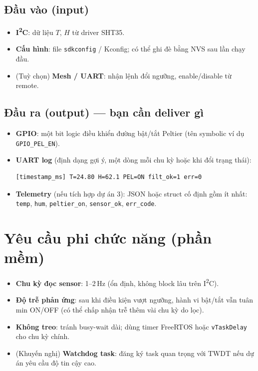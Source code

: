 \documentclass[12pt,a4paper]{report}
\begin{document}
\subsection{Đầu vào (input)}
\begin{itemize}
  \item \textbf{I\textsuperscript{2}C}: dữ liệu $T$, $H$ từ driver SHT35.
  \item \textbf{Cấu hình}: file \texttt{sdkconfig} / Kconfig; có thể ghi đè bằng NVS sau lần chạy đầu.
  \item (Tuỳ chọn) \textbf{Mesh / UART}: nhận lệnh đổi ngưỡng, enable/disable từ remote.
\end{itemize}

\subsection{Đầu ra (output) --- bạn cần deliver gì}
\begin{itemize}
  \item \textbf{GPIO}: một bit logic điều khiển đường bật/tắt Peltier (tên symbolic ví dụ \texttt{GPIO\_PEL\_EN}).
  \item \textbf{UART log} (định dạng gợi ý, một dòng mỗi chu kỳ hoặc khi đổi trạng thái):
  \begin{verbatim}
[timestamp_ms] T=24.80 H=62.1 PEL=ON filt_ok=1 err=0
  \end{verbatim}
  \item \textbf{Telemetry} (nếu tích hợp dự án 3): JSON hoặc struct cố định gồm ít nhất: \texttt{temp}, \texttt{hum}, \texttt{peltier\_on}, \texttt{sensor\_ok}, \texttt{err\_code}.
\end{itemize}

\section{Yêu cầu phi chức năng (phần mềm)}
\begin{itemize}
  \item \textbf{Chu kỳ đọc sensor}: 1--2\,Hz (ổn định, không block lâu trên I\textsuperscript{2}C).
  \item \textbf{Độ trễ phản ứng}: sau khi điều kiện vượt ngưỡng, hành vi bật/tắt vẫn tuân min ON/OFF (có thể chấp nhận trễ thêm vài chu kỳ do lọc).
  \item \textbf{Không treo}: tránh busy-wait dài; dùng timer FreeRTOS hoặc \texttt{vTaskDelay} cho chu kỳ chính.
  \item (Khuyến nghị) \textbf{Watchdog task}: đăng ký task quan trọng với TWDT nếu dự án yêu cầu độ tin cậy cao.
\end{itemize}
\end{document}
